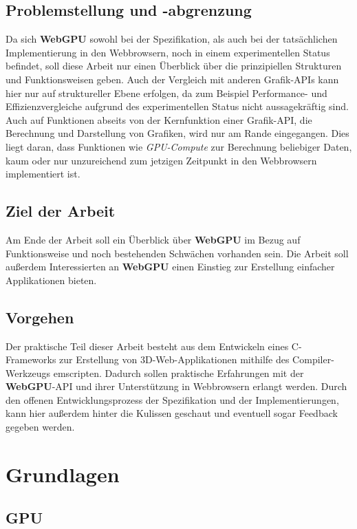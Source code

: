 \documentclass[oneside]{ausarbeitung}
\newcommand*{\quotize}[1]{\glqq #1\grqq}
\begin{document}
\section{Problemstellung und -abgrenzung}
\label{sec:problemstellung}
Da sich \textbf{WebGPU} sowohl bei der Spezifikation, als auch bei der tatsächlichen Implementierung in den Webbrowsern, noch in einem experimentellen Status befindet, soll diese Arbeit nur einen Überblick über die prinzipiellen Strukturen und Funktionsweisen geben. Auch der Vergleich mit anderen Grafik-APIs kann hier nur auf struktureller Ebene erfolgen, da zum Beispiel Performance- und Effizienzvergleiche aufgrund des experimentellen Status nicht aussagekräftig sind. Auch auf Funktionen abseits von der Kernfunktion einer Grafik-API, die Berechnung und Darstellung von Grafiken, wird nur am Rande eingegangen. Dies liegt daran, dass Funktionen wie \textit{GPU-Compute} zur Berechnung \quotize{beliebiger Daten}, kaum oder nur unzureichend zum jetzigen Zeitpunkt in den Webbrowsern implementiert ist.

\section{Ziel der Arbeit}
\label{sec:ziel}
Am Ende der Arbeit soll ein Überblick über \textbf{WebGPU} im Bezug auf Funktionsweise und noch bestehenden Schwächen vorhanden sein. Die Arbeit soll außerdem Interessierten an \textbf{WebGPU} einen Einstieg zur Erstellung einfacher Applikationen bieten.

\section{Vorgehen}
\label{sec:vorgehen}
Der praktische Teil dieser Arbeit besteht aus dem Entwickeln eines C-Frameworks zur Erstellung von 3D-Web-Applikationen mithilfe des Compiler-Werkzeugs emscripten. Dadurch sollen praktische Erfahrungen mit der \textbf{WebGPU}-API und ihrer Unterstützung in Webbrowsern erlangt werden. Durch den offenen Entwicklungsprozess der Spezifikation und der Implementierungen, kann hier außerdem \quotize{hinter die Kulissen} geschaut und eventuell sogar Feedback gegeben werden.


\chapter{Grundlagen}
\label{cha:grundlagen}

\section{GPU}
\label{sec:GPU}
\end{document}
